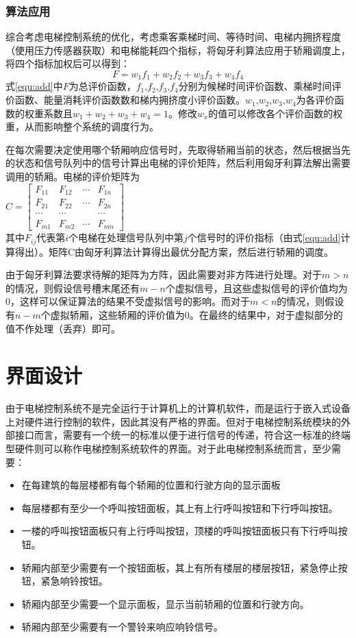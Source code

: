 \subsubsection{算法应用}
综合考虑电梯控制系统的优化，考虑乘客乘梯时间、等待时间、电梯内拥挤程度（使用压力传感器获取）和电梯能耗四个指标，将匈牙利算法应用于轿厢调度上，将四个指标加权后可以得到：
\begin{equation}
	\label{equ:add}
	F = w_1f_1+w_2f_2+w_3f_3+w_4f_4
\end{equation}
式\ref{equ:add}中$F$为总评价函数，$f_1$,$f_2$,$f_3$,$f_4$分别为候梯时间评价函数、乘梯时间评价函数、能量消耗评价函数数和梯内拥挤度小评价函数。$w_1$,$w_2$,$w_3$,$w_4$为各评价函数的权重系数且$w_1+w_2+w_3+w_4=1$。修改$w_x$的值可以修改各个评价函数的权重，从而影响整个系统的调度行为。\par

在每次需要决定使用哪个轿厢响应信号时，先取得轿厢当前的状态，然后根据当先的状态和信号队列中的信号计算出电梯的评价矩阵，然后利用匈牙利算法解出需要调用的轿厢。电梯的评价矩阵为\\
$C=
\begin{bmatrix}
	F_{11} & F_{12} & \dotsm & F_{1n} \\
	F_{21} & F_{22} & \dotsm & F_{2n} \\
	\dotsm & \dotsm &        & \dotsm \\
	F_{m1} & F_{m2} & \dotsm & F_{mn}
\end{bmatrix}$ \\
其中$F_{ij}$代表第$i$个电梯在处理信号队列中第$j$个信号时的评价指标（由式\ref{equ:add}计算得出）。矩阵C由匈牙利算法计算得出最优分配方案，然后进行轿厢的调度。\par
由于匈牙利算法要求待解的矩阵为方阵，因此需要对非方阵进行处理。对于$m>n$的情况，则假设信号槽末尾还有$m-n$个虚拟信号，且这些虚拟信号的评价值均为0，这样可以保证算法的结果不受虚拟信号的影响。而对于$m<n$的情况，则假设有$n-m$个虚拟轿厢，这些轿厢的评价值为0。在最终的结果中，对于虚拟部分的值不作处理（丢弃）即可。

\newpage
\section{界面设计}
由于电梯控制系统不是完全运行于计算机上的计算机软件，而是运行于嵌入式设备上对硬件进行控制的软件，因此其没有严格的界面。但对于电梯控制系统模块的外部接口而言，需要有一个统一的标准以便于进行信号的传递，符合这一标准的终端型硬件则可以称作电梯控制系统软件的界面。对于此电梯控制系统而言，至少需要：
\begin{itemize}
	\item 在每建筑的每层楼都有每个轿厢的位置和行驶方向的显示面板
	\item 每层楼都有至少一个呼叫按钮面板，其上有上行呼叫按钮和下行呼叫按钮。
	\item 一楼的呼叫按钮面板只有上行呼叫按钮，顶楼的呼叫按钮面板只有下行呼叫按钮。
	\item 轿厢内部至少需要有一个按钮面板，其上有所有楼层的楼层按钮，紧急停止按钮，紧急响铃按钮。
	\item 轿厢内部至少需要一个显示面板，显示当前轿厢的位置和行驶方向。
	\item 轿厢内部至少需要有一个警铃来响应响铃信号。
\end{itemize}

